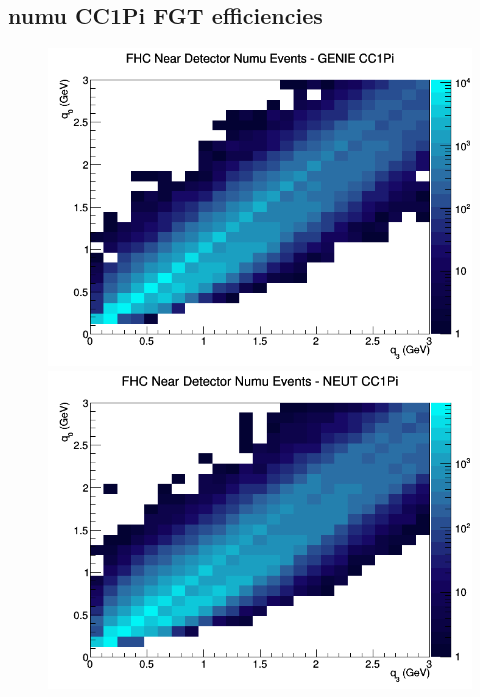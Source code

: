 \subsection{numu CC1Pi FGT efficiencies}
\begin{figure}[h]
\includegraphics[width=\linewidth]{eff_q0_q3/FGT/CC1Pi_FHC_ND_numu_q3_q0_GENIE.png}
\endminipage
{}
\includegraphics[width=\linewidth]{eff_q0_q3/FGT/CC1Pi_FHC_ND_numu_q3_q0_NEUT.png}
\endminipage
{}

\end{figure}
